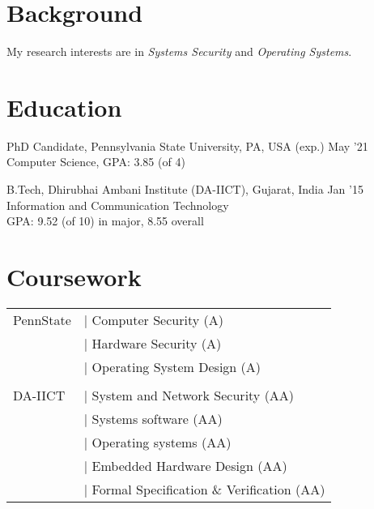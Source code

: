 \documentclass[margin]{res}
\begin{document}
 
\raggedright
{} %




\begin{resume} 
\section{Background}
My research interests are in \emph{Systems Security} and \emph{Operating Systems}.

\section{Education}

PhD Candidate, Pennsylvania State University, PA, USA \hfill (exp.) May '21\\
Computer Science, GPA: 3.85 (of 4)

B.Tech, Dhirubhai Ambani Institute (DA-IICT), Gujarat, India \hfill Jan '15\\
Information and Communication Technology\\
GPA: 9.52 (of 10) in major,
8.55 overall 

\section{Coursework}
\begin{tabular}{l p{2.5in}}
PennState   & $\vert$ Computer Security (A)\\
            & $\vert$ Hardware Security (A)\\
            & $\vert$ Operating System Design (A)\\
\\
DA-IICT     & $\vert$ System and Network Security (AA)\\
            & $\vert$ Systems software (AA)\\
            & $\vert$ Operating systems (AA)\\
            & $\vert$ Embedded Hardware Design (AA)\\
            & $\vert$ Formal Specification \& Verification (AA)
\end{tabular}


\end{resume}
\end{document}
